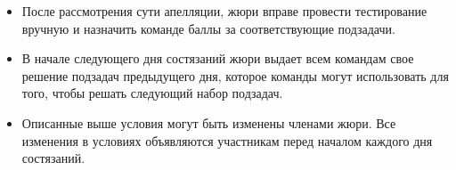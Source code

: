 \begin{itemize}
    \item После рассмотрения сути апелляции, жюри вправе провести тестирование
    вручную и назначить команде баллы за соответствующие подзадачи.

    \item В начале следующего дня состязаний жюри выдает всем командам свое решение
    подзадач предыдущего дня, которое команды могут использовать для того, чтобы
    решать следующий набор подзадач.

    \item Описанные выше условия могут быть изменены членами жюри. Все изменения в
    условиях объявляются участникам перед началом каждого дня состязаний.
\end{itemize}